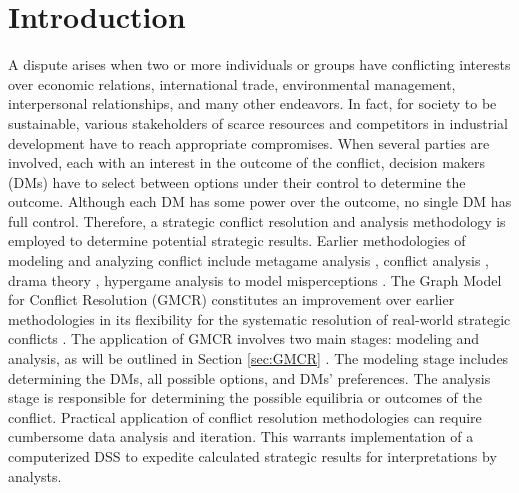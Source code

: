 \documentclass[letterpaper,12pt,titlepage,oneside,final]{book}
\begin{document}


%







\chapter{Introduction}

A dispute arises when two or more individuals or groups have conflicting interests over economic relations, international trade, environmental management, interpersonal relationships, and many other endeavors. In fact, for society to be sustainable, various stakeholders of scarce resources and competitors in industrial development have to reach appropriate compromises. When several parties are involved, each with an interest in the outcome of the conflict, decision makers (DMs) have to select between options under their control to determine the outcome. Although each DM has some power over the outcome, no single DM has full control. Therefore, a strategic conflict resolution and analysis methodology is employed to determine potential strategic results. Earlier methodologies of modeling and analyzing conflict include metagame analysis \cite{howard1971paradoxes,howard1987present}, conflict analysis \cite{fraser1984}, drama theory \cite{howard1994drama1,howard1994drama2}, hypergame analysis to model misperceptions \cite{Bennett1980HYPER,Wang1988Hyper}. The Graph Model for Conflict Resolution (GMCR) constitutes an improvement over earlier methodologies in its flexibility for the systematic resolution of real-world strategic conflicts \cite{kilgour2005}. The application of GMCR involves two main stages: modeling and analysis, as will be outlined in Section \ref{sec:GMCR} \cite{hipel1990formal}. The modeling stage includes determining the DMs, all possible options, and DMs' preferences. The analysis stage is responsible for determining the possible equilibria or outcomes of the conflict.  
Practical application of conflict resolution methodologies can require cumbersome data analysis and iteration. This warrants implementation of a computerized DSS to expedite calculated strategic results for interpretations by analysts. 
\end{document}

